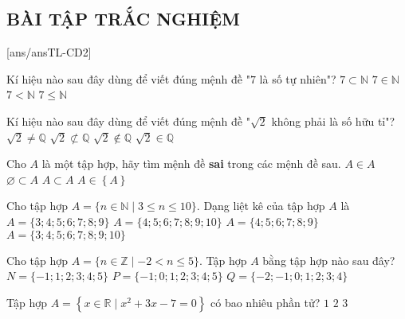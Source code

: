 \subsection{BÀI TẬP TRẮC NGHIỆM}
[ans/ansTL-CD2]
\setcounter{ex}{0}
\begin{ex}
	Kí hiệu nào sau đây dùng để viết đúng mệnh đề "$7$ là số tự nhiên"?
	\choice
	{$7\subset \mathbb{N} $}
	{\True $7\in \mathbb{N} $}
	{$7<\mathbb{N}$}
	{$7\le \mathbb{N}$}
	\loigiai{}
\end{ex}
\begin{ex}
	Kí hiệu nào sau đây dùng để viết đúng mệnh đề "$\sqrt{2}$ không phải là số hữu tỉ"?
	\choice
	{$\sqrt{2}\ne \mathbb{Q} $}
	{$\sqrt{2}\not\subset \mathbb{Q} $}
	{\True $\sqrt{2}\notin \mathbb{Q} $}
	{$\sqrt{2}\in \mathbb{Q} $}
	\loigiai{}
\end{ex}

\begin{ex}%
	Cho $A$ là một tập hợp, hãy tìm mệnh đề \textbf{sai} trong các mệnh đề sau.
	\choice
	{\True $A\in A$}
	{$\varnothing \subset A$}
	{$A\subset A$}
	{$A\in \left\{ A\right\}$}
	\loigiai{}
\end{ex}

\begin{ex}%
	Cho tập hợp $A = \{n \in \mathbb{N} \mid 3 \le n \le 10\}$. Dạng liệt kê của tập hợp $A$ là 
	\choice
	{$A = \{3;4;5;6;7;8;9\}$}
	{$A = \{4;5;6;7;8;9;10\}$}
	{$A = \{4;5;6;7;8;9\}$}
	{\True $A = \{3;4;5;6;7;8;9;10\}$}
\end{ex}
\begin{ex}%
	Cho tập hợp $A = \{n \in \mathbb{Z} \mid -2 < n \le 5\}$. Tập hợp $A$ bằng tập hợp nào sau đây?
	{$N = \{-1; 1;2;3;4; 5 \}$}
	{\True $P = \{-1;0;1;2;3;4;5 \}$}
	{$Q = \{-2;-1; 0; 1;2;3;4 \}$}
\end{ex}
\begin{ex}%
	Tập hợp $A = \left \{x \in \mathbb{R}\mid x^2+3x-7=0 \right\}$ có bao nhiêu phần tử?
	{$1$}
	{\True  $2$}
	{$3$}
\end{ex}


